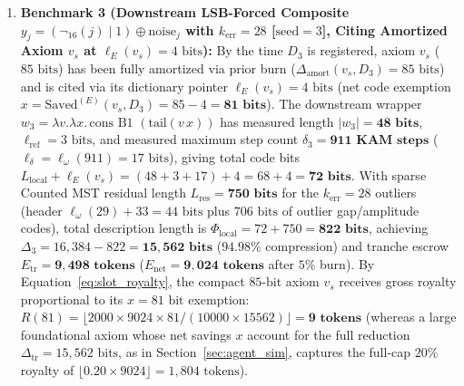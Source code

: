 \documentclass[runningheads,a4paper]{llncs}
\renewcommand{\_}{\textunderscore\allowbreak}
\begin{document}
\begin{enumerate}
  \item \textbf{Benchmark 3 (Downstream LSB-Forced Composite $y_j = (\neg_{16}(j) \mid 1) \oplus \text{noise}_j$ with $k_{\text{err}} = 28$ [$\text{seed} = 3$], Citing Amortized Axiom $v_s$ at $\ell_E(v_s) = 4\text{ bits}$):} By the time $D_3$ is registered, axiom $v_s$ ($85\text{ bits}$) has been fully amortized via prior burn ($\Delta_{\text{amort}}(v_s,\allowbreak D_3) = 85\text{ bits}$) and is cited via its dictionary pointer $\ell_E(v_s) = 4\text{ bits}$ (net code exemption $x = \text{Saved}^{(E)}(v_s,\allowbreak D_3) = 85 - 4 = \mathbf{81\text{ bits}}$). The downstream wrapper $w_3 = \lambda v.\lambda x.\,\allowbreak \text{cons } \text{B1 } (\text{tail}(v\,\allowbreak x))$ has measured length $|w_3| = \mathbf{48\text{ bits}}$, $\ell_{\text{ref}} = 3\text{ bits}$, and measured maximum step count $\delta_3 = \mathbf{911\text{ KAM steps}}$ ($\ell_\delta = \ell_\omega(911) = 17\text{ bits}$), giving total code bits $L_{\text{local}} + \ell_E(v_s) = (48 + 3 + 17) + 4 = 68 + 4 = \mathbf{72\text{ bits}}$. With sparse Counted MST residual length $L_{\text{res}} = \mathbf{750\text{ bits}}$ for the $k_{\text{err}} = 28$ outliers (header $\ell_\omega(29) + 33 = 44\text{ bits}$ plus $706\text{ bits}$ of outlier gap/amplitude codes), total description length is $\Phi_{\text{local}} = 72 + 750 = \mathbf{822\text{ bits}}$, achieving $\Delta_3 = 16,384 - 822 = \mathbf{15,562\text{ bits}}$ ($\mathbf{94.98\%}$ compression) and tranche escrow $E_{\text{tr}} = \mathbf{9,498\text{ tokens}}$ ($E_{\text{net}} = \mathbf{9,024\text{ tokens}}$ after $5\%$ burn). By Equation~\eqref{eq:slot_royalty}, the compact $85\text{-bit}$ axiom $v_s$ receives gross royalty proportional to its $x = 81\text{ bit}$ exemption: $R(81) = \lfloor 2000 \times 9024 \times 81 / (10000 \times 15562) \rfloor = \mathbf{9\text{ tokens}}$ (whereas a large foundational axiom whose net savings $x$ account for the full reduction $\Delta_{\text{tr}} = 15,562\text{ bits}$, as in Section~\ref{sec:agent_sim}, captures the full-cap $20\%$ royalty of $\lfloor 0.20 \times 9024 \rfloor = 1,804\text{ tokens}$).

\end{enumerate}
\end{document}

